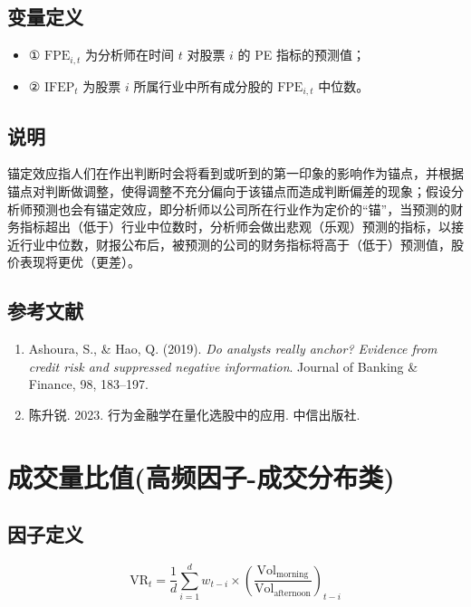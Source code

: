 \documentclass{article}
\begin{document}
\subsection{变量定义}
\begin{itemize}
    \item ① \( \mathrm{FPE}_{i,t} \) 为分析师在时间 \( t \) 对股票 \( i \) 的 PE 指标的预测值；
    \item ② \( \mathrm{IFEP}_t \) 为股票 \( i \) 所属行业中所有成分股的 \( \mathrm{FPE}_{i,t} \) 中位数。
\end{itemize}

\subsection{说明}
锚定效应指人们在作出判断时会将看到或听到的第一印象的影响作为锚点，并根据锚点对判断做调整，使得调整不充分偏向于该锚点而造成判断偏差的现象；假设分析师预测也会有锚定效应，即分析师以公司所在行业作为定价的“锚”，当预测的财务指标超出（低于）行业中位数时，分析师会做出悲观（乐观）预测的指标，以接近行业中位数，财报公布后，被预测的公司的财务指标将高于（低于）预测值，股价表现将更优（更差）。

\subsection{参考文献}
\begin{enumerate}
    \item Ashoura, S., \& Hao, Q. (2019). \textit{Do analysts really anchor? Evidence from credit risk and suppressed negative information}. Journal of Banking \& Finance, 98, 183–197.
    \item 陈升锐. 2023. 行为金融学在量化选股中的应用. 中信出版社.
\end{enumerate}

\section{成交量比值(高频因子-成交分布类)}

\subsection{因子定义}
\begin{equation}
    \mathrm{VR}_t = \frac{1}{d} \sum_{i=1}^{d} w_{t-i} \times \left( \frac{\mathrm{Vol}_{\mathrm{morning}}}{\mathrm{Vol}_{\mathrm{afternoon}}} \right)_{t-i}
\end{equation}
\end{document}
